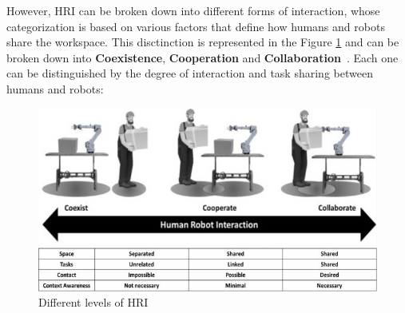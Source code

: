 However, \ac{HRI} can be broken down into different forms of interaction, whose categorization is based on various factors that define how 
humans and robots share the workspace. This disctinction is represented in the Figure \ref{fig:collab} and can be broken down into \textbf{Coexistence}, \textbf{Cooperation} and \textbf{Collaboration}~\cite{Jahanmahin2022}. 
Each one can be distinguished by the degree of interaction and task sharing between humans and robots:

\begin{figure}[!htbp]
    \includegraphics[width=\linewidth]{figs/table-figure-together.jpeg}
    \caption{Different levels of \ac{HRI}~\cite{Jahanmahin2022}} 
    \label{fig:collab}
\end{figure} 

